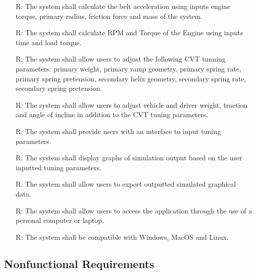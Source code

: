 \documentclass[12pt]{article}
\newcounter{reqnum} %
\begin{document}
\begin{itemize}
\item[R\refstepcounter{reqnum}\thereqnum \label{R_8}:] The system shall calculate the belt acceleration using inputs engine torque, primary radius, friction force and mass of the system. 

\item[R\refstepcounter{reqnum}\thereqnum \label{R_9}:] The system shall calculate RPM and Torque of the Engine using inputs time and load torque.

\item[R\refstepcounter{reqnum}\thereqnum \label{R_10}:] The system shall allow users to adjust the following CVT tunning parameters: primary weight, primary ramp geometry, primary spring rate, primary spring pretension, secondary helix geometry, secondary spring rate, secondary spring pretension. 

\item[R\refstepcounter{reqnum}\thereqnum \label{R_11}:] The system shall allow users to adjust vehicle and driver weight, traction and angle of incline in addition to the CVT tuning parameters.

\item[R\refstepcounter{reqnum}\thereqnum \label{R_12}:] The system shall provide users with an interface to input tuning parameters.

\item[R\refstepcounter{reqnum}\thereqnum \label{R_13}:] The system shall display graphs of simulation output based on the user inputted tuning parameters.

\item[R\refstepcounter{reqnum}\thereqnum \label{R_14}:] The system shall allow users to export outputted simulated graphical data.

\item[R\refstepcounter{reqnum}\thereqnum \label{R_15}:] The system shall allow users to access the application through the use of a personal computer or laptop.

\item[R\refstepcounter{reqnum}\thereqnum \label{R_16}:] The system shall be compatible with Windows, MacOS and Linux.
\end{itemize}

\subsection{Nonfunctional Requirements}
\end{document}

